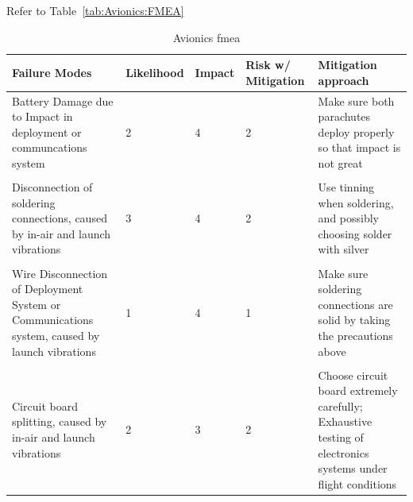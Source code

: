   Refer to Table~\ref{tab:Avionics:FMEA}
\begin{table}[htbp]
    \centering
    \caption{Avionics \gls{fmea}}
    \begin{tabularx}{\linewidth}{X l l l X}
        \toprule
        \textbf{Failure Modes} & \textbf{Likelihood} & \textbf{Impact} & \textbf{Risk w/ Mitigation} & \textbf{Mitigation approach} \\
        \midrule
        Battery Damage due to Impact in deployment or communcations system & 2     & 4     & 2     & Make sure both parachutes deploy properly so that impact is not great \\\\
        Disconnection of soldering connections, caused by in-air and launch vibrations & 3     & 4     & 2     & Use tinning when soldering, and possibly choosing solder with silver \\\\
        Wire Disconnection of Deployment System or Communications system, caused by launch vibrations & 1     & 4     & 1     & Make sure soldering connections are solid by taking the precautions above \\\\
        Circuit board splitting, caused by in-air and launch vibrations & 2     & 3     & 2     & Choose circuit board extremely carefully; Exhaustive testing of electronics systems under flight conditions \\
        \bottomrule
    \end{tabularx}%
    \label{tab:Avionics:FMEA 2}%
  \end{table}%
  

